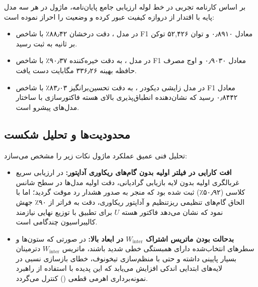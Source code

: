 بر اساس کارنامه تجربی در خط لوله ارزیابی جامع پایان‌نامه، ماژول  در هر سه مدل پایه با اقتدار از دروازه کیفیت عبور کرده و وضعیت  را احراز نموده است:
\begin{itemize}
    \item در مدل ، دقت درخشان ۸۸٫۴۲٪ با شاخص F1 معادل ۰٫۸۹۱۰ و توان ۵۲,۴۲۶ توکن بر ثانیه به ثبت رسید.
    \item در مدل ، به دقت خیره‌کننده ۹۰٫۳۷٪ با شاخص F1 معادل ۰٫۹۰۳۰ و اوج مصرف حافظه بهینه ۳۳۶٫۲۶ مگابایت دست یافت.
    \item در مدل زایشی دیکودر ، به دقت تحسین‌برانگیز ۸۳٫۰۳٪ با شاخص F1 معادل ۰٫۸۴۴۲ رسید که نشان‌دهنده انطباق‌پذیری بالای هسته فاکتورسازی  با ساختار مدل‌های پیشرو است.
\end{itemize}

\subsection{محدودیت‌ها و تحلیل شکست}
تحلیل فنی عمیق عملکرد ماژول نکات زیر را مشخص می‌سازد:
\begin{itemize}
    \item \textbf{افت کارایی در فیلتر اولیه بدون گام‌های ریکاوری آداپتور:} در ارزیابی سریع غربالگری اولیه بدون لایه بازیابی گرادیانی، دقت اولیه مدل‌ها در سطح شانس کلاسی (۵۰٫۹۲٪) ثبت شده بود که منجر به صدور هشدار رد موقت گردید؛ اما با الحاق گام‌های تنظیمی ریزتنظیم و آداپتور ریکاوری، دقت به فراتر از ۹۰٪ جهش نمود که نشان می‌دهد فاکتور هسته $U$ برای تطبیق با توزیع نهایی نیازمند کالیبراسیون چندگامی است.
    \item \textbf{بدحالت بودن ماتریس اشتراک $W_{\text{inter}}$ در ابعاد بالا:} در صورتی که ستون‌ها و سطرهای انتخاب‌شده دارای همبستگی خطی شدید باشند، ماتریس $W_{\text{inter}}$ دترمینان بسیار پایینی داشته و حتی با منظم‌سازی تیخونوف، خطای بازسازی نسبی در لایه‌های ابتدایی اندکی افزایش می‌یابد که این پدیده با استفاده از راهبرد نمونه‌برداری اهرمی قطعی () کنترل می‌گردد.
\end{itemize}
